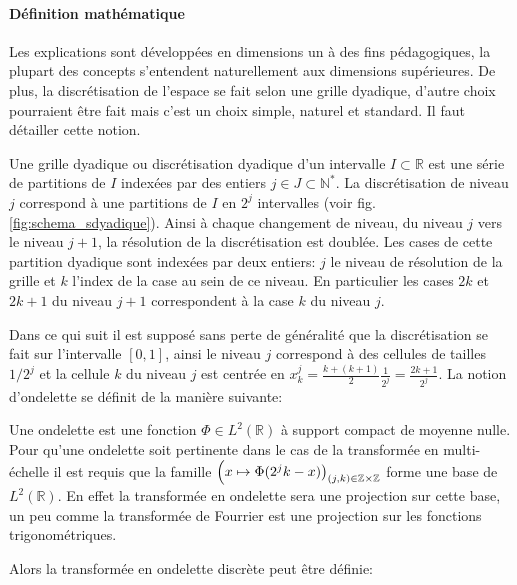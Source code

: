     \paragraph{Définition mathématique}
        Les explications sont développées en dimensions un à des fins pédagogiques, la plupart des concepts s'entendent naturellement aux dimensions supérieures. 
        De plus, la discrétisation de l'espace se fait selon une grille dyadique, d'autre choix pourraient être fait mais c'est un choix simple, naturel et standard.
        Il faut détailler cette notion.
        \begin{definition}
            Une grille dyadique ou discrétisation dyadique d'un intervalle $I \subset \mathbb R$ est une série de partitions de $I$ indexées 
            par des entiers $j \in J \subset \mathbb N^*$.
            La discrétisation de niveau $j$ correspond à une partitions de $I$ en $2^j$ intervalles (voir fig. \ref{fig:schema_sdyadique}). Ainsi à chaque changement de niveau, du niveau $j$ vers le niveau $j+1$,
            la résolution de la discrétisation est doublée. Les cases de cette partition dyadique sont indexées par deux entiers: $j$ le niveau de résolution de la grille
            et $k$ l'index de la case au sein de ce niveau. En particulier les cases $2k$ et $2k+1$ du niveau $j+1$ correspondent à la case $k$ du niveau $j$.
        \end{definition}
        
        Dans ce qui suit il est supposé sans perte de généralité que la discrétisation se fait sur l'intervalle $[0,1]$,
        ainsi le niveau $j$ correspond à des cellules de tailles $1/{2^j}$ et la cellule $k$ du niveau $j$ est centrée en
        $x_k^j = \frac{k+(k+1)}{2} \frac{1}{2^j} = \frac{2k+1}{2^j}.$
        La notion d'ondelette se définit de la manière suivante:
        \begin{definition}[Ondelette]
            Une ondelette est une fonction $\Phi \in L^2(\mathbb R)$ à support compact de moyenne nulle.
            Pour qu'une ondelette soit pertinente dans le cas de la transformée en multi-échelle il est requis
            que la famille $\Bigl(x \mapsto \Phi( 2^j k - x ) \bigr)_{ (j,k)\in \mathbb{Z} \times \mathbb{Z} }$ forme une base de $L^2(\mathbb{R})$.
            En effet la transformée en ondelette sera une projection sur cette base, un peu comme la transformée de Fourrier est une projection sur les 
            fonctions trigonométriques.
        \end{definition}
        Alors la transformée en ondelette discrète peut être définie:
